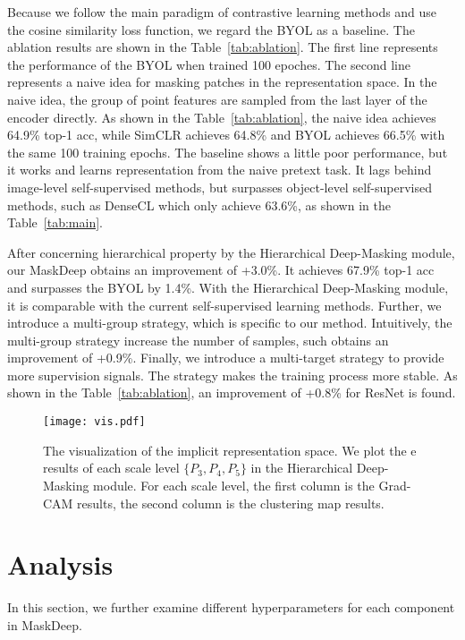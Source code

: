 \documentclass[10pt,twocolumn,letterpaper]{article}
\begin{document}
Because we follow the main paradigm of contrastive learning methods and use the cosine similarity loss function, we regard the BYOL as a baseline. 
The ablation results are shown in the Table~\ref{tab:ablation}. The first line represents the performance of the BYOL when trained 100 epoches. The second line represents a naive idea for masking patches in the representation space. In the naive idea, the group of point features are  sampled from the last layer of the encoder directly. As shown in the Table~\ref{tab:ablation}, the naive idea achieves 64.9\% top-1 acc, while SimCLR achieves 64.8\% and BYOL achieves 66.5\% with the same 100 training epochs. The baseline shows a little poor performance, but it works and learns representation from the naive pretext task. It lags behind image-level self-supervised methods, but surpasses object-level self-supervised methods, such as DenseCL which only achieve 63.6\%, as shown in the Table~\ref{tab:main}.

After concerning hierarchical property by the Hierarchical Deep-Masking module, our MaskDeep obtains an improvement of +3.0\%. It achieves 67.9\% top-1 acc and surpasses the BYOL by 1.4\%. With the Hierarchical Deep-Masking module, it is comparable with the current self-supervised learning methods.
Further, we introduce a multi-group strategy, which is specific to our method. Intuitively, the multi-group strategy increase the number of samples, such  obtains an improvement of +0.9\%. 
Finally, we introduce a multi-target strategy to provide more supervision signals. The strategy makes the training process more stable. As shown in the Table~\ref{tab:ablation}, an improvement of +0.8\% for ResNet is found. 

\begin{figure*}[t]
     \centering
    \texttt{[image: vis.pdf]}
     \caption{The visualization of the implicit representation space. We plot the e results of each scale level $\{P_3, P_4, P_5\}$ in the Hierarchical Deep-Masking module. For each scale level, the first column is the Grad-CAM results, the second column is the clustering map results.}
     \label{fig:visual}
\end{figure*}


\section{Analysis}

In this section, we further examine different hyperparameters for each component in MaskDeep. 
\end{document}
